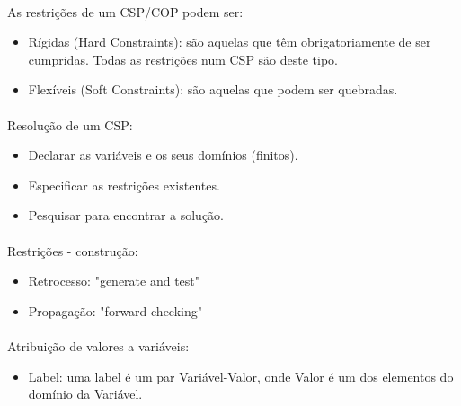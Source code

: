 \documentclass[../resumosPLOG.tex]{subfiles}
\begin{document}
\paragraph{}

As restrições de um CSP/COP podem ser:
\begin{itemize}
    \item Rígidas (Hard Constraints): são aquelas que têm obrigatoriamente de ser cumpridas. Todas as restrições num CSP são deste tipo.
    \item Flexíveis (Soft Constraints): são aquelas que podem ser quebradas.
\end{itemize}

\paragraph{}

Resolução de um CSP:
\begin{itemize}
    \item Declarar as variáveis e os seus domínios (finitos).
    \item Especificar as restrições existentes.
    \item Pesquisar para encontrar a solução.
\end{itemize}

\paragraph{}

Restrições - construção:
\begin{itemize}
    \item Retrocesso: "generate and test"
    \item Propagação: "forward checking"
\end{itemize}

\paragraph{}

Atribuição de valores a variáveis:
\begin{itemize}
    \item Label: uma label é um par Variável-Valor, onde Valor é um dos elementos do domínio da Variável.
\end{itemize}

\paragraph{}
\end{document}

